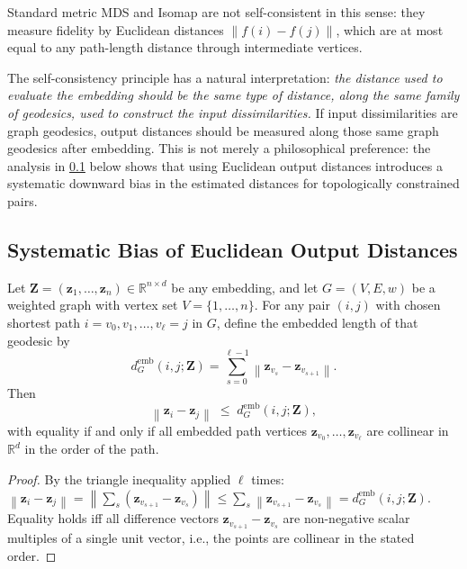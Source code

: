 \documentclass[twoside,11pt]{article}
\newcommand{\R}{\mathbb{R}}
\newcommand{\bz}{\mathbf{z}}
\newcommand{\bZ}{\mathbf{Z}}
\newcommand{\norm}[1]{\left\|#1\right\|}
\newcommand{\demb}{d^{\mathrm{emb}}}
\begin{document}
Standard metric MDS and Isomap are not self-consistent in this sense:
they measure fidelity by Euclidean distances $\norm{f(i) - f(j)}$, which
are at most equal to any path-length distance through intermediate vertices.

The self-consistency principle has a natural interpretation:
\emph{the distance used to evaluate the embedding should be the same
type of distance, along the same family of geodesics, used to construct
the input dissimilarities.}
If input dissimilarities are graph geodesics, output distances should be
measured along those same graph geodesics after embedding.  This is not
merely a philosophical preference: the
analysis in \cref{sec:systematic_bias} below shows that using Euclidean
output distances introduces a systematic downward bias in the estimated
distances for topologically constrained pairs.

\subsection{Systematic Bias of Euclidean Output Distances}
\label{sec:systematic_bias}

\begin{proposition}
  \label{prop:bias}
  Let $\bZ = (\bz_1, \ldots, \bz_n) \in \R^{n \times d}$ be any embedding,
  and let $G = (V, E, w)$ be a weighted graph with vertex set $V = \{1,
  \ldots, n\}$.  For any pair $(i,j)$ with chosen shortest path
  $i = v_0, v_1, \ldots, v_\ell = j$ in $G$, define the embedded length of
  that geodesic by
  \begin{equation}
    \demb_G(i,j;\bZ)
    = \sum_{s=0}^{\ell-1} \norm{\bz_{v_s} - \bz_{v_{s+1}}}.
    \label{eq:emb_geo}
  \end{equation}
  Then
  \begin{equation}
    \norm{\bz_i - \bz_j} \;\leq\; \demb_G(i,j;\bZ),
    \label{eq:triangle_bias}
  \end{equation}
  with equality if and only if all embedded path vertices
  $\bz_{v_0}, \ldots, \bz_{v_\ell}$ are collinear in $\R^d$ in the order
  of the path.
\end{proposition}

\begin{proof}
  By the triangle inequality applied $\ell$ times:
  $\norm{\bz_i - \bz_j} = \norm{\sum_{s} (\bz_{v_{s+1}} - \bz_{v_s})}
  \leq \sum_s \norm{\bz_{v_{s+1}} - \bz_{v_s}} = \demb_G(i,j;\bZ)$.
  Equality holds iff all difference vectors $\bz_{v_{s+1}} - \bz_{v_s}$
  are non-negative scalar multiples of a single unit vector, i.e., the
  points are collinear in the stated order.
\end{proof}
\end{document}
